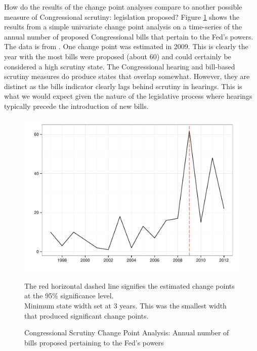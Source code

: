 \documentclass[a4paper]{article}\usepackage[]{graphicx}\usepackage[]{color}
\newenvironment{knitrout}{}{} %
\begin{document}
How do the results of the change point analyses compare to another possible measure of Congressional scrutiny: legislation proposed? Figure \ref{fig:BillsCompare} shows the results from a simple univariate change point analysis on a time-series of the annual number of proposed Congressional bills that pertain to the Fed's powers. The data is from \cite{Binder2014}. One change point was estimated in 2009. This is clearly the year with the most bills were proposed (about 60) and could certainly be considered a high scrutiny state. The Congressional hearing and bill-based scrutiny measures do produce states that overlap somewhat. However, they are distinct as the bills indicator clearly lags behind scrutiny in hearings. This is what we would expect given the nature of the legislative process where hearings typically precede the introduction of new bills.

\begin{figure}
    \caption{Congressional Scrutiny Change Point Analysis: Annual number of bills proposed pertaining to the Fed's powers}
    \label{fig:BillsCompare}
\begin{knitrout}
\color{fgcolor}

{\centering \includegraphics[width=0.8\linewidth]{figure/ScrutinyBills} 

}



\end{knitrout}
{\scriptsize{The red horizontal dashed line signifies the estimated change points at the 95\% significance level.\\
Minimum state width set at 3 years. This was the smallest width that produced significant change points.}}
\end{figure}
\end{document}
